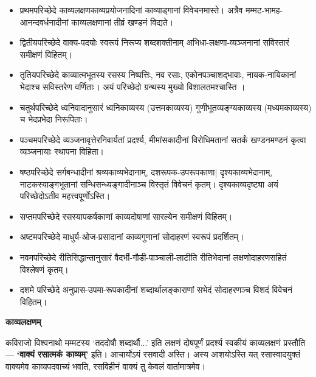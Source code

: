 \documentclass[10pt, a5paper, twoside]{article}
\newcommand{\customparagraph}[1]{
    \noindent \textbf{#1} \par
    \penalty 10000 %
    \vspace{0.1cm plus 0.05cm minus 0.02cm}
    \penalty 10000 %
}
\begin{document}
\begin{itemize}
\item प्रथमपरिच्छेदे काव्यलक्षणकाव्यप्रयोजनादिनां काव्याड्गानां विवेचनमास्ते। अत्रैव मम्मट-भामह-आनन्दवर्धनादीनां काव्यलक्षणानां तीव्रं खण्डनं विद्यते।


\item द्वितीयपरिच्छेदे वाक्य-पदयोः स्वरूपं निरूप्य शब्दशक्तीनाम् अभिधा-लक्षणा-व्यञ्जनानां सविस्तारं समीक्षणं विहितम्।


\item तृतियपरिच्छेदे काव्यात्मभूतस्य रसस्य निष्पत्तिः, नव रसाः, एकोनपञ्चाशद्भावाः, नायक-नायिकानां भेदाश्च सविस्तरेण वर्णिताः। अयं परिच्छेदो ग्रन्थस्य मुख्यो विशालतमश्चास्ति ।


\item चतुर्थपरिच्छेदे ध्वनिवादानुसारं ध्वनिकाव्यस्य (उत्तमकाव्यस्य) गुणीभूतव्यङ्ग्यकाव्यस्य (मध्यमकाव्यस्य) च भेदप्रभेदा निरूपिताः।


\item पञ्चमपरिच्छेदे व्यञ्जनावृत्तेरनिवार्यतां प्रदर्श्य, मीमांसकादीनां विरोधिमतानां सतर्कं खण्डनमण्डनं कृत्वा व्यञ्जनायाः स्थापना विहिता।


\item षष्ठपरिच्छेदे सर्गबन्धादीनां श्रव्यकाव्यभेदानाम्, दशरूपक-उपरूपकाणा| दृश्यकाव्यभेदानाम्, नाटकस्याङ्गभूतानां सन्धिसन्ध्यङ्गादीनाञ्च विस्तृतं विवेचनं कृतम्। दृश्यकाव्यदृष्ट्या अयं परिच्छेदोऽतीव महत्त्वपूर्णोऽस्ति।


\item सप्तमपरिच्छेदे रसस्यापकर्षकाणां काव्यदोषाणां सारल्येन समीक्षणं विहितम्।


\item अष्टमपरिच्छेदे माधुर्य-ओज-प्रसादानां काव्यगुणानां सोदाहरणं स्वरूपं प्रदर्शितम्।


\item नवमपरिच्छेदे रीतिसिद्धान्तानुसारं वैदर्भी-गौडी-पाञ्चाली-लाटीति रीतिभेदानां लक्षणोदाहरणसहितं विश्लेषणं कृतम्।


\item दशमे परिच्छेदे अनुप्रास-उपमा-रूपकादीनां शब्दार्थालङ्काराणां सभेदं सोदाहरणञ्च विशदं विवेचनं विहितम्।


\end{itemize}
\customparagraph{\textbf{काव्यलक्षणम्}}

कविराजो विश्वनाथो मम्मटस्य ‘तददोषौ शब्दार्थौ...’ इति लक्षणं दोषपूर्णं प्रदर्श्य स्वकीयं काव्यलक्षणं प्रस्तौति— \textbf{‘वाक्यं रसात्मकं काव्यम्’} इति। आचार्योऽयं रसवादी अस्ति। अस्य आशयोऽस्ति यत् रसास्वादयुक्तं वाक्यमेव काव्यपदवाच्यं भवति, रसविहीनं वाक्यं तु केवलं वार्तामात्रमेव।
\end{document}
